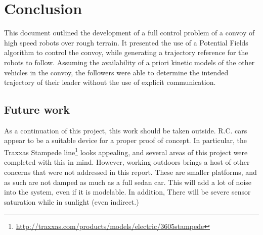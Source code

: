 \chapter{Conclusion}
This document outlined the development of a full control problem of a convoy of high speed robots over rough terrain. It presented the use of a Potential Fields algorithm to control the convoy, while generating a trajectory reference for the robots to follow. Assuming the availability of a priori kinetic models of the other vehicles in the convoy, the followers were able to determine the intended trajectory of their leader without the use of explicit communication.

\section{Future work}
As a continuation of this project, this work should be taken outside. R.C. cars appear to be a suitable device for a proper proof of concept. In particular, the Traxxas Stampede line\footnote{\url{http://traxxas.com/products/models/electric/3605stampede}} looks appealing, and several areas of this project were completed with this in mind. However, working outdoors brings a host of other concerns that were not addressed in this report. These are smaller platforms, and as such are not damped as much as a full sedan car. This will add a lot of noise into the system, even if it is modelable. In addition, There will be severe sensor saturation while in sunlight (even indirect.)

